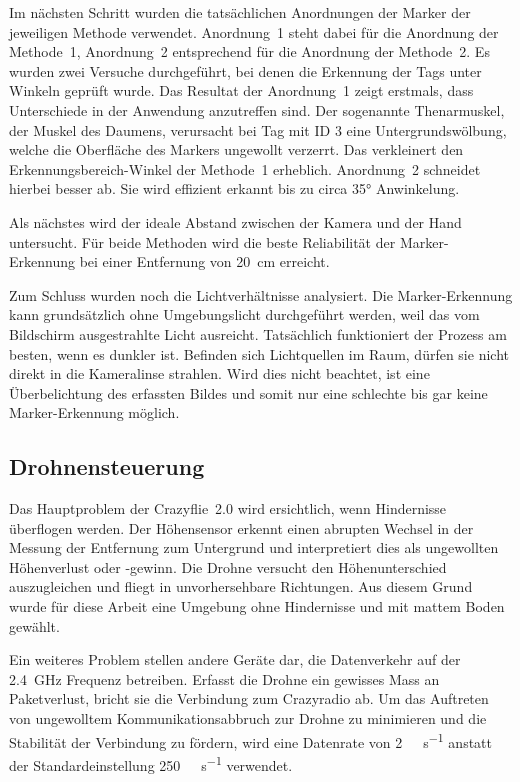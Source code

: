 Im nächsten Schritt wurden die tatsächlichen Anordnungen der Marker der jeweiligen Methode verwendet.
Anordnung~1 steht dabei für die Anordnung der Methode~1, Anordnung~2 entsprechend für die Anordnung der Methode~2.
Es wurden zwei Versuche durchgeführt, bei denen die Erkennung der Tags unter Winkeln geprüft wurde.
Das Resultat der Anordnung~1 zeigt erstmals, dass Unterschiede in der Anwendung anzutreffen sind.
Der sogenannte Thenarmuskel, der Muskel des Daumens, verursacht bei Tag mit ID 3 eine Untergrundswölbung, welche die Oberfläche des Markers ungewollt verzerrt.
Das verkleinert den Erkennungsbereich-Winkel der Methode~1 erheblich.
Anordnung~2 schneidet hierbei besser ab.
Sie wird effizient erkannt bis zu circa 35° Anwinkelung\footnotemark{}.

Als nächstes wird der ideale Abstand zwischen der Kamera und der Hand untersucht.
Für beide Methoden wird die beste Reliabilität der Marker-Erkennung bei einer Entfernung von \SI{20}{\centi\meter} erreicht.

Zum Schluss wurden noch die Lichtverhältnisse analysiert.
Die Marker-Erkennung kann grundsätzlich ohne Umgebungslicht durchgeführt werden, weil das vom Bildschirm ausgestrahlte Licht ausreicht.
Tatsächlich funktioniert der Prozess am besten, wenn es dunkler ist.
Befinden sich Lichtquellen im Raum, dürfen sie nicht direkt in die Kameralinse strahlen.
Wird dies nicht beachtet, ist eine Überbelichtung des erfassten Bildes und somit nur eine schlechte bis gar keine Marker-Erkennung möglich.

\subsection{Drohnensteuerung}
\label{sec:drco}

Das Hauptproblem der Crazyflie~2.0 wird ersichtlich, wenn Hindernisse überflogen werden.
Der Höhensensor erkennt einen abrupten Wechsel in der Messung der Entfernung zum Untergrund und interpretiert dies als ungewollten Höhenverlust oder -gewinn.
Die Drohne versucht den Höhenunterschied auszugleichen und fliegt in unvorhersehbare Richtungen.
Aus diesem Grund wurde für diese Arbeit eine Umgebung ohne Hindernisse und mit mattem Boden gewählt.

Ein weiteres Problem stellen andere Geräte dar, die Datenverkehr auf der \SI{2.4}{\giga\hertz} Frequenz betreiben.
Erfasst die Drohne ein gewisses Mass an Paketverlust, bricht sie die Verbindung zum Crazyradio ab.
Um das Auftreten von ungewolltem Kommunikationsabbruch zur Drohne zu minimieren und die Stabilität der Verbindung zu fördern, wird eine Datenrate von \SI{2}{\mega\bit\per\second} anstatt der Standardeinstellung \SI{250}{\kilo\bit\per\second} verwendet.

